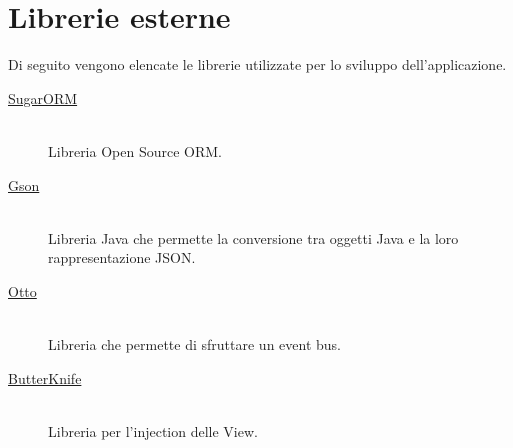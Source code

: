 


\chapter{Librerie esterne}
Di seguito vengono elencate le librerie utilizzate per lo sviluppo dell'applicazione.

\begin{description}

\item[\href{http://satyan.github.io/sugar}{SugarORM}] \hfill \\
Libreria Open Source ORM.

\item[\href{https://code.google.com/p/google-gson/}{Gson}] \hfill \\
Libreria Java che permette la conversione tra oggetti Java e la loro rappresentazione JSON.

\item[\href{http://square.github.io/otto/}{Otto}] \hfill \\
Libreria che permette di sfruttare un event bus.

\item[\href{https://github.com/JakeWharton/butterknife}{ButterKnife}] \hfill \\
Libreria per l'injection delle View.
\end{description}